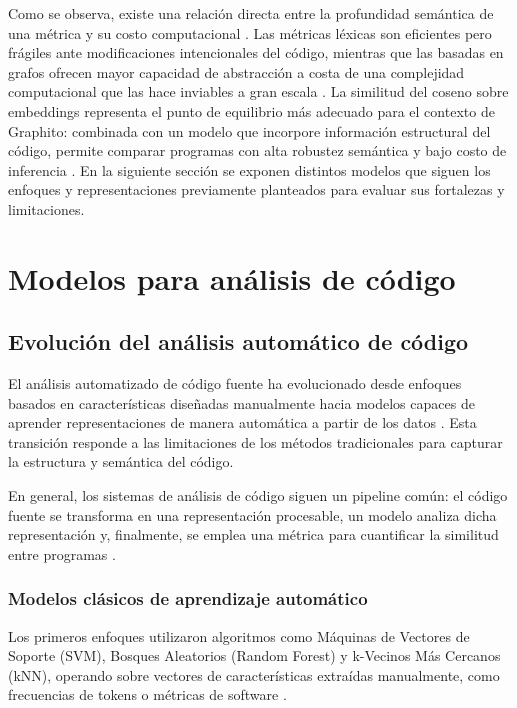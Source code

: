 Como se observa, existe una relación directa entre la profundidad 
semántica de una métrica y su costo computacional \cite{Roy2007Survey}. 
Las métricas léxicas son eficientes pero frágiles ante modificaciones 
intencionales del código, mientras que las basadas en grafos ofrecen 
mayor capacidad de abstracción a costa de una complejidad computacional 
que las hace inviables a gran escala \cite{Yu2023Graph}. La similitud 
del coseno sobre embeddings representa el punto de equilibrio más 
adecuado para el contexto de Graphito: combinada con un modelo que 
incorpore información estructural del código, 
permite comparar programas con alta robustez semántica y bajo costo 
de inferencia \cite{Alon2018Code2Vec, Lu2026CSSG}. En la siguiente sección se exponen distintos modelos que siguen los enfoques y representaciones previamente planteados para evaluar sus fortalezas y limitaciones.


\section{Modelos para análisis de código}

\subsection{Evolución del análisis automático de código}

El análisis automatizado de código fuente ha evolucionado desde enfoques basados en características diseñadas manualmente hacia modelos capaces de aprender representaciones de manera automática a partir de los datos \cite{Alon2018Code2Vec}. Esta transición responde a las limitaciones de los métodos tradicionales para capturar la estructura y semántica del código.

En general, los sistemas de análisis de código siguen un pipeline común: el código fuente se transforma en una representación procesable, un modelo analiza dicha representación y, finalmente, se emplea una métrica para cuantificar la similitud entre programas \cite{Alon2018Code2Vec}.

\subsubsection{Modelos clásicos de aprendizaje automático}

Los primeros enfoques utilizaron algoritmos como Máquinas de Vectores de Soporte (SVM), Bosques Aleatorios (Random Forest) y k-Vecinos Más Cercanos (kNN), operando sobre vectores de características extraídas manualmente, como frecuencias de tokens o métricas de software \cite{Manning2008Introduction}.

